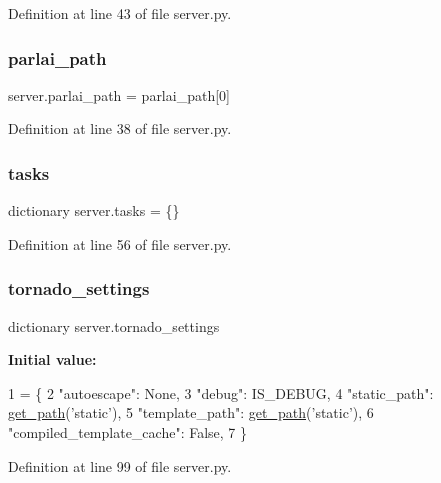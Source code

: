 Definition at line 43 of file server.\+py.

\mbox{\label{namespaceserver_abd4781cfa228e5322b9a3dad522e4b17}} 
\subsubsection{\texorpdfstring{parlai\+\_\+path}{parlai\_path}}
{\footnotesize\ttfamily server.\+parlai\+\_\+path = parlai\+\_\+path\mbox{[}0\mbox{]}}



Definition at line 38 of file server.\+py.

\mbox{\label{namespaceserver_a847ccf0f415507e9b016ec8b9239669c}} 
\subsubsection{\texorpdfstring{tasks}{tasks}}
{\footnotesize\ttfamily dictionary server.\+tasks = \{\}}



Definition at line 56 of file server.\+py.

\mbox{\label{namespaceserver_a3c637d57121d469c84c0f13a6fe3722b}} 
\subsubsection{\texorpdfstring{tornado\+\_\+settings}{tornado\_settings}}
{\footnotesize\ttfamily dictionary server.\+tornado\+\_\+settings}

{\bfseries Initial value\+:}
\begin{DoxyCode}
1 =  \{
2     \textcolor{stringliteral}{"autoescape"}: \textcolor{keywordtype}{None},
3     \textcolor{stringliteral}{"debug"}: IS\_DEBUG,
4     \textcolor{stringliteral}{"static\_path"}: \hyperlink{namespaceserver_aa8c035a44061d07462939492cd21b0b8}{get\_path}(\textcolor{stringliteral}{'static'}),
5     \textcolor{stringliteral}{"template\_path"}: \hyperlink{namespaceserver_aa8c035a44061d07462939492cd21b0b8}{get\_path}(\textcolor{stringliteral}{'static'}),
6     \textcolor{stringliteral}{"compiled\_template\_cache"}: \textcolor{keyword}{False},
7 \}
\end{DoxyCode}


Definition at line 99 of file server.\+py.

